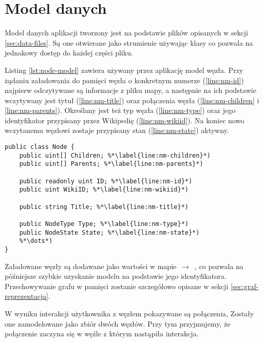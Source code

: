 \section{Model danych}

Model danych aplikacji tworzony jest na podstawie plików opisanych w sekcji \ref{sec:data-files}. Są one otwierane jako strumienie używając klasy  co pozwala na jednakowy dostęp do każdej części pliku. 

Listing \ref{lst:node-model} zawiera używany przez aplikację model węzła. Przy żądaniu załadowania do pamięci węzła o konkretnym numerze (\ref{line:nm-id}) najpierw odczytywane są informacje z pliku mapy, a następnie na ich podstawie wczytywany jest tytuł (\ref{line:nm-title}) oraz połączenia węzła (\ref{line:nm-children} i \ref{line:nm-parents}). Określany jest też typ węzła (\ref{line:nm-type}) oraz jego identyfikator przypisany przez Wikipedię (\ref{line:nm-wikiid}). Na koniec nowo wczytanemu węzłowi zostaje przypisany stan (\ref{line:nm-state}) aktywny.
\begin{lstlisting}[caption={Model węzła grafu}, label=lst:node-model]
public class Node {
	public uint[] Children; %*\label{line:nm-children}*)
	public uint[] Parents; %*\label{line:nm-parents}*)

	public readonly uint ID; %*\label{line:nm-id}*)
	public uint WikiID; %*\label{line:nm-wikiid}*)

	public string Title; %*\label{line:nm-title}*)

	public NodeType Type; %*\label{line:nm-type}*)
	public NodeState State; %*\label{line:nm-state}*)
	%*\dots*)
}
\end{lstlisting}

Załadowane węzły są dodawane jako wartości w mapie  $\,\to\,$ , co pozwala na późniejsze szybkie uzyskanie modelu na podstawie jego identyfikatora. Przechowywanie grafu w pamięci zostanie szczegółowo opisane w sekcji \ref{sec:graf-reprezentacja}.

W wyniku interakcji użytkownika z węzłem pokazywane są połączenia, Zostały one zamodelowane jako zbiór dwóch węzłów. Przy tym przyjmujemy, że połączenie zaczyna się w węźle z którym nastąpiła interakcja.
